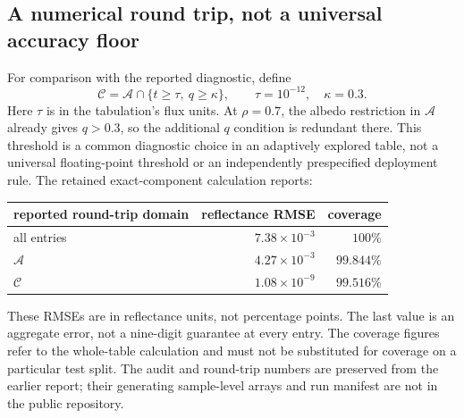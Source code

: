 \begin{table}[t]
\centering

\caption{Retained tabulation audit over all $6{,}644{,}205$ state--band entries.
The categories overlap. Small positive transmission is a conditioning diagnostic, not a
failure of $t>0$; values outside the albedo interval fail the stated physical screen,
not necessarily the algebraic domain of definition.}
\label{tab:domain}
\end{table}

\subsection{A numerical round trip, not a universal accuracy floor}
For comparison with the reported diagnostic, define
\[
 \mathcal C=\mathcal A\cap\{t\ge\tau,\ q\ge\kappa\},
 \qquad \tau=10^{-12},\quad\kappa=0.3.
\]
Here $\tau$ is in the tabulation's flux units. At $\rho=0.7$, the albedo restriction in
$\mathcal A$ already gives $q>0.3$, so the additional $q$ condition is redundant there.
This threshold is a common diagnostic choice in an adaptively explored table, not a
universal floating-point threshold or an independently prespecified deployment rule.
The retained exact-component calculation reports:

\begin{center}
\begin{tabular}{lrr}
\toprule
reported round-trip domain & reflectance RMSE & coverage \\
\midrule
all entries & $7.38\times10^{-3}$ & $100\%$ \\
$\mathcal A$ & $4.27\times10^{-3}$ & $99.844\%$ \\
$\mathcal C$ & $1.08\times10^{-9}$ & $99.516\%$ \\
\bottomrule
\end{tabular}
\end{center}

These RMSEs are in reflectance units, not percentage points. The last value is an
aggregate error, not a nine-digit guarantee at every entry. The coverage figures refer
to the whole-table calculation and must not be substituted for coverage on a particular
test split. The audit and round-trip numbers are preserved from the earlier report;
their generating sample-level arrays and run manifest are not in the public repository.

